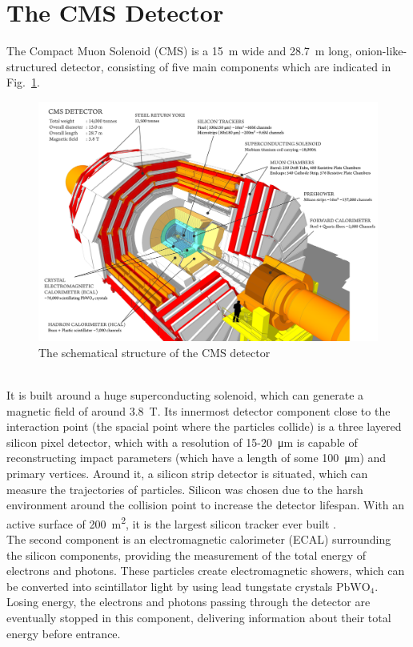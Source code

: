 \section{The CMS Detector}
The Compact Muon Solenoid (CMS) is a \SI{15}{\meter} wide and \SI{28.7}{\meter} long, onion-like-structured detector, consisting of five main components which are indicated in Fig.~\ref{fig:cms}.
\begin{figure}[h]
	\centering
	\includegraphics[width=0.9\linewidth]{Figures/CMS}
	\caption{The schematical structure of the CMS detector \parencite{CMS_Detector}}
	\label{fig:cms}
\end{figure}\\
It is built around a huge superconducting solenoid, which can generate a magnetic field of around \SI{3.8}{\tesla}. Its innermost detector component close to the interaction point (the spacial point where the particles collide) is a three layered silicon pixel detector, which with a resolution of 15-\SI{20}{\micro\meter} is capable of reconstructing impact parameters (which have a length of some
\SI{100}{\micro\meter}) and primary vertices. Around it, a silicon strip detector is situated, which can measure the trajectories of particles. Silicon was chosen due to the harsh environment around the collision point to increase the detector lifespan. With an active surface of \SI{200}{\meter\squared}, it is the largest silicon tracker ever built \parencite{CMS_collaboration}.\\
The second component is an electromagnetic calorimeter (ECAL) surrounding the silicon components, providing the measurement of the total energy of electrons and photons. These particles create electromagnetic showers, which can be converted into scintillator light by using lead tungstate crystals $\text{PbWO}_4$. Losing energy, the electrons and photons passing through the detector are eventually stopped in this component, delivering information about their total energy before entrance.\\
